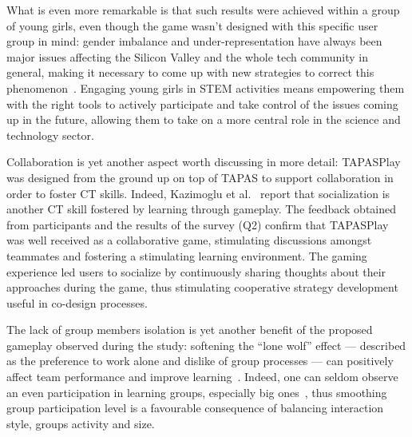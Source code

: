 What is even more remarkable is that such results were achieved within a group of young girls, even though the game wasn't designed with this specific user group in mind: gender imbalance and under-representation have always been major issues affecting the Silicon Valley and the whole tech community in general, making it necessary to come up with new strategies to correct this phenomenon~\cite{tzafilkou2017gender,beckwith2006gender,Huff:2002:GSD:543812.543842,Cassell:1998:BMK:295056}. Engaging young girls in \ac{STEM} activities means empowering them with the right tools to actively participate and take control of the issues coming up in the future, allowing them to take on a more central role in the science and technology sector.


Collaboration is yet another aspect worth discussing in more detail: TAPASPlay was designed from the ground up on top of \ac{TAPAS} to support collaboration in order to foster \ac{CT} skills. Indeed, Kazimoglu et al.~\cite{Kazimoglu:2012ft} report that socialization is another \ac{CT} skill fostered by learning through gameplay. The feedback obtained from participants and the results of the survey (Q2) confirm that TAPASPlay was well received as a collaborative game, stimulating discussions amongst teammates and fostering a stimulating learning environment. The gaming experience led users to socialize by continuously sharing thoughts about their approaches during the game, thus stimulating cooperative strategy development useful in co-design processes.

The lack of group members isolation is yet another benefit of the proposed gameplay observed during the study: softening the ``lone wolf'' effect --- described as the preference to work alone and dislike of group processes --- can positively affect team performance and improve learning~\cite{barr2005exploring}. Indeed, one can seldom observe an even participation in learning groups, especially big ones~\cite{Turchi:2015dr}, thus smoothing group participation level is a favourable consequence of balancing interaction style, groups activity and size.

